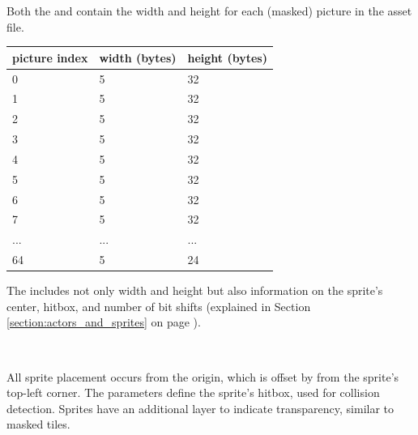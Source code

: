 \documentclass[book.tex]{subfiles}
\begin{document}
\pagebreak
Both the  and  contain the width and height for each (masked) picture in the asset file.\\
  \begin{table}[H]
  \begin{tabularx}{0.8\textwidth}[c]{XXX}
  \hline
  \textbf{picture index} & \textbf{width (bytes)} & \textbf{height (bytes)}   \\ \hline
  0             & 5          & 32    \\
  1             & 5          & 32    \\
  2             & 5          & 32    \\
  3             & 5          & 32    \\
  4             & 5          & 32    \\
  5             & 5          & 32    \\
  6             & 5          & 32    \\
  7             & 5          & 32    \\
  ...             & ...          & ...    \\
  64             & 5          & 24    \\
  \end{tabularx}
  \end{table}

\par
The  includes not only width and height but also information on the sprite's center, hitbox, and number of bit shifts (explained in Section \ref{section:actors_and_sprites} on page \pageref{section:actors_and_sprites}). \\

\par
\begin{minipage}{\textwidth}
 \par
 \end{minipage}\\


\par
All sprite placement occurs from the origin, which is offset by  from the sprite's top-left corner. The parameters  define the sprite's hitbox, used for collision detection. Sprites have an additional layer to indicate transparency, similar to masked tiles.\\
\end{document}
